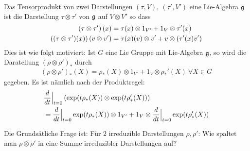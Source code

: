 \begin{definition}[Tensorprodukt]
    Das Tensorprodukt von zwei Darstellungen $(\tau,V), \ (\tau',V')$ eine
    Lie-Algebra $\mathfrak{g}$ ist die Darstellung $\tau \otimes \tau'$ von $\mathfrak{g}$ auf
    $V \otimes V'$ so dass
    \begin{align*}
        \left( \tau \otimes \tau' \right)(x) &= \tau(x) \otimes 1_{V'} + 1_V \otimes \tau'(x)
        \\
        \left( (\tau \otimes \tau')(x) \right)(v \otimes v') &= \tau(x)(v) \otimes v' + v \otimes \left( \tau'(x)v' \right)
    \end{align*}
    Dies ist wie folgt motiviert: Ist $G$ eine Lie Gruppe mit Lie-Algebra $\mathfrak{g}$,
    so wird die Daratellung $(\rho \otimes \rho')_\ast$ durch
    \begin{align*}
        (\rho \otimes \rho')_\ast (X) = \rho_\ast (X) \otimes 1_{V'} + 1_V \otimes \rho_\ast' (X)
        \ \forall X \in G
    \end{align*}
    gegeben. Es ist nämlich nach der Produktregel:
    \begin{align*}
        &\frac{d}{dt} \Big|_{t=0} \left( \exp(t \rho_\ast (X)) \otimes
            \exp(t \rho_\ast' (X)) \right)
        \\
        &= \frac{d}{dt} \Big|_{t=0} \exp(t \rho_\ast (X)) \otimes 1_{V'}
        + 1_V \otimes \frac{d}{dt} \Big|_{t=0} \exp(t \rho_\ast' (X))
    \end{align*}
\end{definition}

Die Grundsätliche Frage ist: Für $2$ irreduzible Darstellungen $\rho,\rho'$:
Wie spaltet man $\rho \otimes \rho'$ in eine Summe irreduzibler Darstellungen
auf?

